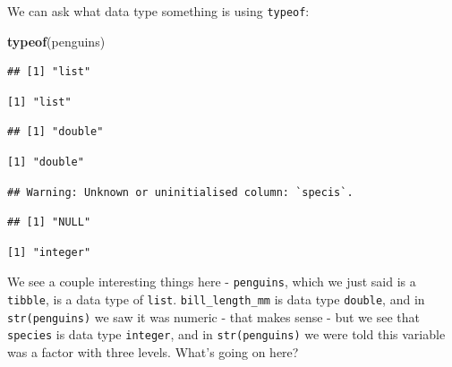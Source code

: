 \documentclass[
]{book}
\newenvironment{Shaded}{\begin{snugshade}}{\end{snugshade}}
\newcommand{\KeywordTok}[1]{\textcolor[rgb]{0.13,0.29,0.53}{\textbf{#1}}}
\newcommand{\NormalTok}[1]{#1}
\newcommand{\OperatorTok}[1]{\textcolor[rgb]{0.81,0.36,0.00}{\textbf{#1}}}
\begin{document}
We can ask what data type something is using \texttt{typeof}:

\begin{Shaded}
\begin{Highlighting}[]
\KeywordTok{typeof}\NormalTok{(penguins)}
\end{Highlighting}
\end{Shaded}

\begin{verbatim}
## [1] "list"
\end{verbatim}

\begin{verbatim}
[1] "list"
\end{verbatim}

\begin{Shaded}
\end{Shaded}

\begin{verbatim}
## [1] "double"
\end{verbatim}

\begin{verbatim}
[1] "double"
\end{verbatim}

\begin{Shaded}
\end{Shaded}

\begin{verbatim}
## Warning: Unknown or uninitialised column: `specis`.
\end{verbatim}

\begin{verbatim}
## [1] "NULL"
\end{verbatim}

\begin{verbatim}
[1] "integer"
\end{verbatim}

We see a couple interesting things here - \texttt{penguins}, which we just said is a \texttt{tibble}, is a data type of \texttt{list}. \texttt{bill\_length\_mm} is data type \texttt{double}, and in \texttt{str(penguins)} we saw it was numeric - that makes sense - but we see that \texttt{species} is data type \texttt{integer}, and in \texttt{str(penguins)} we were told this variable was a factor with three levels. What's going on here?
\end{document}
